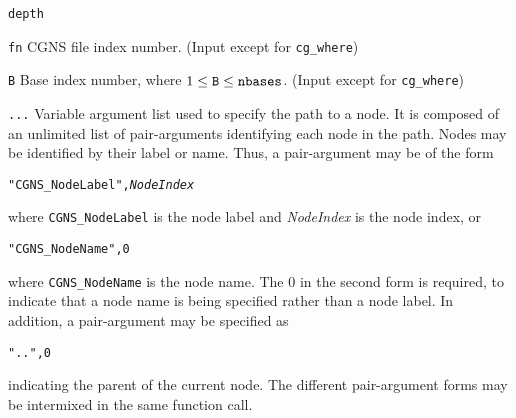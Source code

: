 \begin{Ventryi}{\texttt{depth}}\raggedright
\item [\texttt{fn}]
      CGNS file index number.
      (\textcolor{input}{Input} except for \texttt{cg\_where})
\item [\texttt{B}]
      Base index number, where $1 \leq \text{\texttt{B}} \leq \text{\texttt{nbases}}$.
      (\textcolor{input}{Input} except for \texttt{cg\_where})
\item [\texttt{...}]
      Variable argument list used to specify the path to a node.
      It is composed of an unlimited list of pair-arguments
      identifying each node in the path.
      Nodes may be identified by their label or name.
      Thus, a pair-argument may be of the form
\begin{alltt}
   "CGNS\_NodeLabel", \textit{NodeIndex}
\end{alltt}
      where \texttt{CGNS\_NodeLabel} is the node label and
      \textit{NodeIndex} is the node index, or
\begin{alltt}
   "CGNS\_NodeName", 0
\end{alltt}
      where \texttt{CGNS\_NodeName} is the node name.
      The 0 in the second form is required, to indicate that a node
      name is being specified rather than a node label.
      In addition, a pair-argument may be specified as
\begin{alltt}
   "..", 0
\end{alltt}
      indicating the parent of the current node.
      The different pair-argument forms may be intermixed in the same
      function call.


\end{Ventryi}

